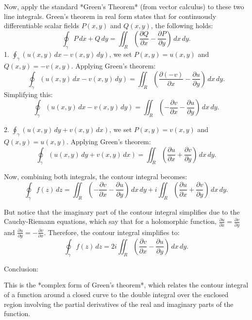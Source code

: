 \documentclass[12pt,a4paper]{article}
\begin{document}
	
	Now, apply the standard *Green's Theorem* (from vector calculus) to these two line integrals. Green's theorem in real form states that for continuously differentiable scalar fields \( P(x, y) \) and \( Q(x, y) \), the following holds:
	\[
	\oint_{\gamma} P \, dx + Q \, dy = \iint_R \left( \frac{\partial Q}{\partial x} - \frac{\partial P}{\partial y} \right) \, dx \, dy.
	\]
	1. \( \oint_{\gamma} \left( u(x, y) \, dx - v(x, y) \, dy \right) \), we set \( P(x, y) = u(x, y) \) and \( Q(x, y) = -v(x, y) \). Applying Green's theorem:
	\[
	\oint_{\gamma} \left( u(x, y) \, dx - v(x, y) \, dy \right) = \iint_R \left( \frac{\partial (-v)}{\partial x} - \frac{\partial u}{\partial y} \right) \, dx \, dy.
	\]
	Simplifying this:
	\[
	\oint_{\gamma} \left( u(x, y) \, dx - v(x, y) \, dy \right) = \iint_R \left( -\frac{\partial v}{\partial x} - \frac{\partial u}{\partial y} \right) \, dx \, dy.
	\]
	
	2.  \( \oint_{\gamma} \left( u(x, y) \, dy + v(x, y) \, dx \right) \), we set \( P(x, y) = v(x, y) \) and \( Q(x, y) = u(x, y) \). Applying Green's theorem:
	\[
	\oint_{\gamma} \left( u(x, y) \, dy + v(x, y) \, dx \right) = \iint_R \left( \frac{\partial u}{\partial x} + \frac{\partial v}{\partial y} \right) \, dx \, dy.
	\]

	
	Now, combining both integrals, the contour integral becomes:
	\[
	\oint_{\gamma} f(z) \, dz = \iint_R \left( -\frac{\partial v}{\partial x} - \frac{\partial u}{\partial y} \right) \, dx \, dy + i \iint_R \left( \frac{\partial u}{\partial x} + \frac{\partial v}{\partial y} \right) \, dx \, dy.
	\]
	
	But notice that the imaginary part of the contour integral simplifies due to the Cauchy-Riemann equations, which say that for a holomorphic function, \( \frac{\partial u}{\partial x} = \frac{\partial v}{\partial y} \) and \( \frac{\partial u}{\partial y} = -\frac{\partial v}{\partial x} \). Therefore, the contour integral simplifies to:
	\[
	\oint_{\gamma} f(z) \, dz = 2i \iint_R \left( \frac{\partial v}{\partial x} - \frac{\partial u}{\partial y} \right) \, dx \, dy.
	\]
	
	 Conclusion:
	
	This is the *complex form of Green's theorem*, which relates the contour integral of a function around a closed curve to the double integral over the enclosed region involving the partial derivatives of the real and imaginary parts of the function. \\ \\ \\ 
	\newpage
	
\end{document}
